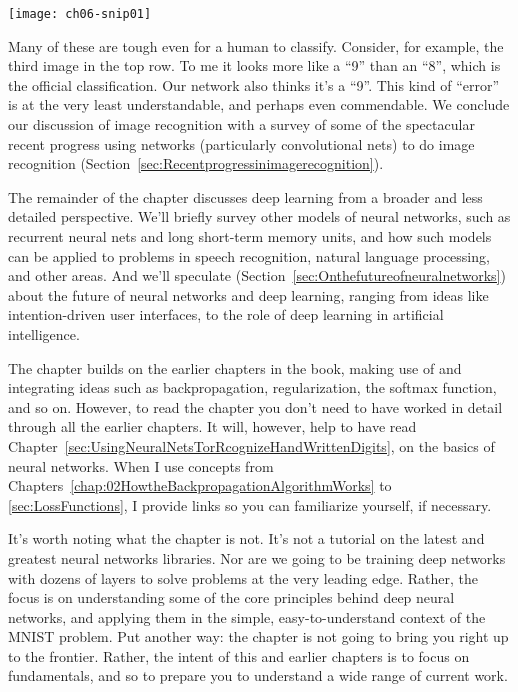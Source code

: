    \begin{figure*}[tph]
        \texttt{[image: ch06-snip01]}
        \label{fig:ch06-snip01}
        \end{figure*}

Many of these are tough even for a human to classify. Consider, for example, the third image in the top row. To me it looks more like a ``9'' than an ``8'', which is the official classification. Our network also thinks it's a ``9''. This kind of ``error'' is at the very least understandable, and perhaps even commendable. We conclude our discussion of image recognition with a survey of some of the spectacular recent progress using networks (particularly convolutional nets) to do image recognition (Section~\ref{sec:Recentprogressinimagerecognition}).

The remainder of the chapter discusses deep learning from a broader and less detailed perspective. We'll briefly survey other models of neural networks, such as recurrent neural nets and long short-term memory units, and how such models can be applied to problems in speech recognition, natural language processing, and other areas. And we'll speculate (Section~\ref{sec:Onthefutureofneuralnetworks}) about the future of neural networks and deep learning, ranging from ideas like intention-driven user interfaces, to the role of deep learning in artificial intelligence.

The chapter builds on the earlier chapters in the book, making use of and integrating ideas such as backpropagation, regularization, the softmax function, and so on. However, to read the chapter you don't need to have worked in detail through all the earlier chapters. It will, however, help to have read Chapter~\ref{sec:UsingNeuralNetsTorRcognizeHandWrittenDigits}, on the basics of neural networks. When I use concepts from Chapters~\ref{chap:02HowtheBackpropagationAlgorithmWorks} to \ref{sec:LossFunctions}, I provide links so you can familiarize yourself, if necessary.

It's worth noting what the chapter is not. It's not a tutorial on the latest and greatest neural networks libraries. Nor are we going to be training deep networks with dozens of layers to solve problems at the very leading edge. Rather, the focus is on understanding some of the core principles behind deep neural networks, and applying them in the simple, easy-to-understand context of the MNIST problem. Put another way: the chapter is not going to bring you right up to the frontier. Rather, the intent of this and earlier chapters is to focus on fundamentals, and so to prepare you to understand a wide range of current work.

